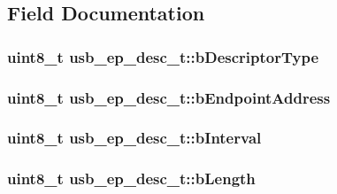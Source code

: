 \subsection{\-Field \-Documentation}
\hypertarget{structusb__ep__desc__t_ae881cfe829a29de12aea7dcc64c84d76}{
\subsubsection[{b\-Descriptor\-Type}]{\setlength{\rightskip}{0pt plus 5cm}uint8\-\_\-t {\bf usb\-\_\-ep\-\_\-desc\-\_\-t\-::b\-Descriptor\-Type}}}
\label{structusb__ep__desc__t_ae881cfe829a29de12aea7dcc64c84d76}
\hypertarget{structusb__ep__desc__t_ae72d2c478693d43712626763e1b9f311}{
\subsubsection[{b\-Endpoint\-Address}]{\setlength{\rightskip}{0pt plus 5cm}uint8\-\_\-t {\bf usb\-\_\-ep\-\_\-desc\-\_\-t\-::b\-Endpoint\-Address}}}
\label{structusb__ep__desc__t_ae72d2c478693d43712626763e1b9f311}
\hypertarget{structusb__ep__desc__t_aa1dac2219f2a658d66e768f138604f1c}{
\subsubsection[{b\-Interval}]{\setlength{\rightskip}{0pt plus 5cm}uint8\-\_\-t {\bf usb\-\_\-ep\-\_\-desc\-\_\-t\-::b\-Interval}}}
\label{structusb__ep__desc__t_aa1dac2219f2a658d66e768f138604f1c}
\hypertarget{structusb__ep__desc__t_a1b1f36413d7701c85786390adc914671}{
\subsubsection[{b\-Length}]{\setlength{\rightskip}{0pt plus 5cm}uint8\-\_\-t {\bf usb\-\_\-ep\-\_\-desc\-\_\-t\-::b\-Length}}}
